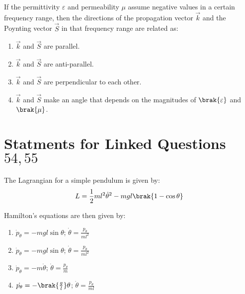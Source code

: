 \iffalse
                       
                        
                        
                        
                    
                        \author{AI24BTECH11006 - Bugada Roopansha}
                        \section{PH}
                        \chapter{2010}
                        \fi
 


    \item If the permittivity $ \varepsilon $ and permeability $ \mu $ assume negative values in a certain frequency range, then the directions of the propagation vector $ \vec{k} $ and the Poynting vector $ \vec{S} $ in that frequency range are related as:

    \begin{enumerate}
        \item $ \vec{k} $ and $ \vec{S} $ are parallel.
        \item $ \vec{k} $ and $ \vec{S} $ are anti-parallel.
        \item $ \vec{k} $ and $ \vec{S} $ are perpendicular to each other.
        \item $ \vec{k} $ and $ \vec{S} $ make an angle that depends on the magnitudes of $ \brak{\varepsilon} $ and $ \brak{\mu} $.
    \end{enumerate}
   \section{Statments for Linked Questions $54,55$}     
     The Lagrangian for a simple pendulum is given by:
    \[
    L = \frac{1}{2} m l^2 \dot{\theta}^2 - mg l \brak{1 - \cos \theta}
    \]
    
   \item  Hamilton's equations are then given by:
    \begin{enumerate}
        \item $ \dot{p}_\theta = -mg l \sin \theta $; $ \dot{\theta} = \frac{p_\theta}{m l^2} $
        \item $ \dot{p}_\theta = -mg l \sin \theta $; $\dot{\theta} = \frac{p_\theta}{m l^2} $
        \item $ \dot{p}_\theta = -m \dot{\theta} $; $ \dot{\theta} = \frac{p_\theta}{m } $
        \item $ \dot{p_\theta}=-\brak{\frac{g}{l}} \theta $; $ \dot{\theta} = \frac{p_\theta}{m l} $
    \end{enumerate}


